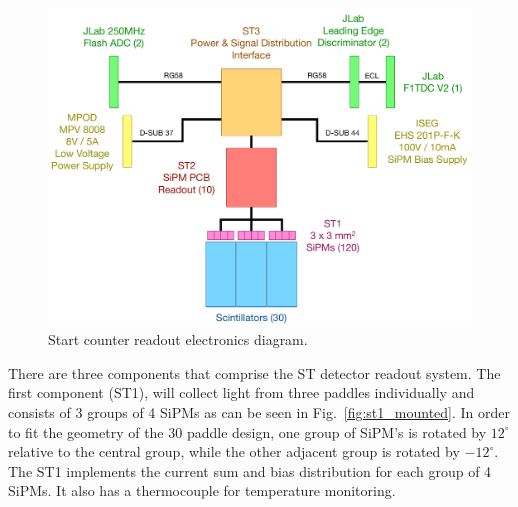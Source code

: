 	\begin{figure}[!htb]
		\centering
		\includegraphics[width=1.0\columnwidth]{design/figs/st_electronics_diagram}
		\caption{Start counter readout electronics diagram.}
		\label{fig:Start Counter Electronics}
	\end{figure}

There are three components that comprise the ST detector readout system.  The first component (ST1), will collect light from three paddles individually and consists of 3 groups of 4 SiPMs as can be seen in Fig.~\ref{fig:st1_mounted}.  In order to fit the geometry of the 30 paddle design, one group of SiPM's is rotated by $12^{\circ}$ relative to the central group, while the other adjacent group is rotated by $-12^{\circ}$.  The ST1 implements the current sum and bias distribution for each group of 4 SiPMs.  It also has a thermocouple for temperature monitoring.  


